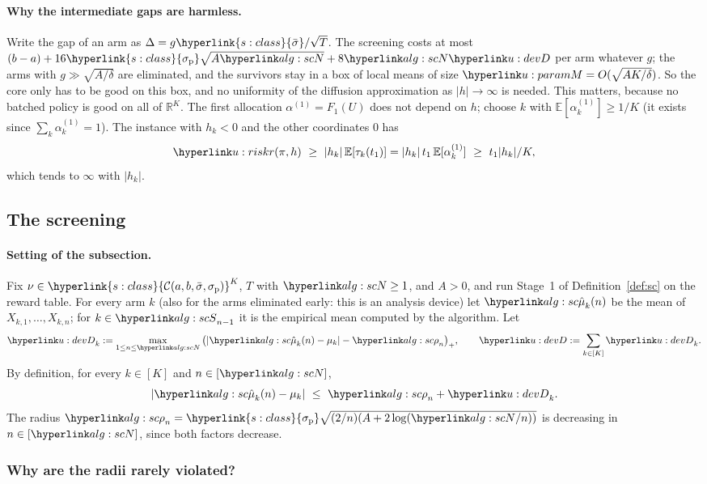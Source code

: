 \documentclass[11pt]{article}
\newcommand{\dt}[1]{\hypertarget{#1}{}}
\DeclareRobustCommand{\sy}[2]{{\hyperlink{#1}{#2}}}
\newcommand{\R}{\mathbb{R}}
\newcommand{\E}{\mathbb{E}}
\newcommand{\1}{\mathbf{1}}
\newcommand{\Cab}{\sy{s:class}{\mathcal C(a,b,\bar\sigma,\sigma_{\mathrm p})}}
\newcommand{\sbar}{\sy{s:class}{\bar\sigma}}
\newcommand{\sigp}{\sy{s:class}{\sigma_{\mathrm p}}}
\begin{document}
\paragraph{Why the intermediate gaps are harmless.} Write the gap of an arm as $\Delta=g\sbar/\sqrt T$. The screening costs at most
$(b-a)+16\sigp\sqrt{A\uN}+8\uN\uD$ per arm whatever $g$; the arms with $g\gg\sqrt{A/\delta}$ are eliminated, and the survivors stay in a box of local means of
size $\uM=O(\sqrt{AK/\delta})$. So the core only has to be good on this box, and no uniformity of the diffusion approximation as $|h|\to\infty$ is needed.
This matters, because no batched policy is good on all of $\R^K$. The first allocation $\alpha^{(1)}=F_1(U)$ does not depend on $h$; choose $k$ with
$\E[\alpha^{(1)}_k]\ge1/K$ (it exists since $\sum_k\alpha^{(1)}_k=1$). The instance with $h_k<0$ and the other coordinates $0$ has
\[
\urk(\pi,h)\ \ge\ |h_k|\,\E[\tau_k(t_1)]=|h_k|\,t_1\,\E[\alpha^{(1)}_k]\ \ge\ t_1|h_k|/K ,
\]
which tends to $\infty$ with $|h_k|$.

\subsection{The screening}\label{sec:app-u-screen}

\paragraph{Setting of the subsection.}\dt{u:dev} Fix $\nu\in\Cab^K$, $T$ with $\uN\ge1$, and $A>0$, and run Stage~1 of Definition~\ref{def:sc} on the reward table.
For every arm $k$ (also for the arms eliminated early: this is an analysis device) let $\umuh_k(n)$ be the mean of $X_{k,1},\dots,X_{k,n}$; for
$k\in\uS_{n-1}$ it is the empirical mean computed by the algorithm. Let
\[
\uD_k:=\max_{1\le n\le\uN}\big(|\umuh_k(n)-\mu_k|-\urho_n\big)_+,\qquad \uD:=\sum_{k\in[K]}\uD_k .
\]
By definition, for every $k\in[K]$ and $n\in[\uN]$,
\begin{equation}\label{eq:u-basic}
|\umuh_k(n)-\mu_k|\ \le\ \urho_n+\uD_k .
\end{equation}
The radius $\urho_n=\sigp\sqrt{(2/n)(A+2\log(\uN/n))}$ is decreasing in $n\in[\uN]$, since both factors decrease.

\subsubsection*{Why are the radii rarely violated?}
\end{document}
